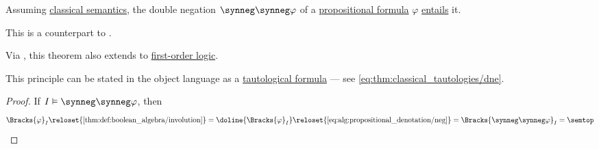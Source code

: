 \begin{theorem}\label{thm:propositional_semantic_dne}
  Assuming \hyperref[def:truth_value_algebra/classical]{classical semantics}, the double negation \( \synneg \synneg \varphi \) of a \hyperref[def:propositional_formula]{propositional formula} \( \varphi \) \hyperref[def:propositional_semantics/entailment]{entails} it.
\end{theorem}
\begin{comments}
  \item This is a counterpart to .

  \item Via , this theorem also extends to \hyperref[def:first_order_logic]{first-order logic}.

  \item This principle can be stated in the object language as a \hyperref[def:tautology]{tautological formula} --- see \eqref{eq:thm:classical_tautologies/dne}.
\end{comments}
\begin{proof}
  If \( I \vDash \synneg \synneg \varphi \), then
  \begin{equation*}
    \Bracks{\varphi}_I
    \reloset {\ref{thm:def:boolean_algebra/involution}} =
    \doline{\Bracks{\varphi}_I}
    \reloset {\eqref{eq:alg:propositional_denotation/neg}} =
    \Bracks{\synneg \synneg \varphi}_I
    =
    \semtop
  \end{equation*}
\end{proof}

